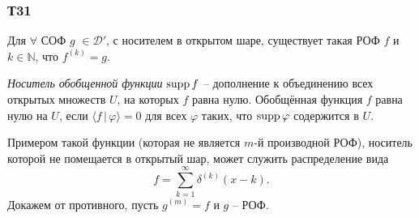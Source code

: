 \subsubsection*{Т31}
 
\begin{to_thr}[]
    Для $\forall$ СОФ $g$ $\in \mathcal D'$, с носителем в открытом шаре, существует такая РОФ $f$ и $k \in \mathbb{N}$, что $f^{(k)} = g$.
\end{to_thr}

\begin{to_def}
    \textit{Носитель обобщенной функции} $\mathop{\mathrm{supp}}\nolimits f$ -- дополнение к объединению всех открытых множеств $U$, на которых $f$ равна нулю.  Обобщённая функция $f$ равна нулю на $U$, если $\langle f \,|\, \varphi \rangle =0$ для всех $\varphi$ таких, что $\mathop{\mathrm{supp}}\nolimits \varphi$ содержится в $U$. 
\end{to_def}

Примером такой функции (которая не является $m$-й производной РОФ), носитель которой не помещается в открытый шар, может служить распределение вида
\begin{equation*}
    f = \sum_{k=1}^{\infty} \delta^{(k)} (x-k).
\end{equation*}
Докажем от противного, пусть $g^{(m)} = f$ и $g$ -- РОФ. 